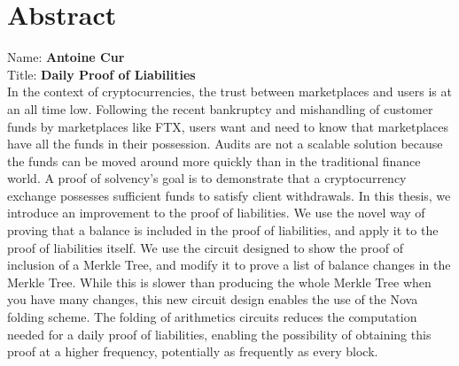 
\chapter*{Abstract}

Name: 	\tab \textbf{Antoine Cur} \\
Title: 	\tab \textbf{Daily Proof of Liabilities}\\

In the context of cryptocurrencies, the trust between marketplaces and users is at an all time low. 
Following the recent bankruptcy and mishandling of customer funds by marketplaces like FTX, 
users want and need to know that marketplaces have all the funds in their possession. 
Audits are not a scalable solution because the funds can be moved around more quickly than in the traditional finance world. 
A proof of solvency's goal is to demonstrate that a cryptocurrency exchange possesses sufficient funds to satisfy client withdrawals. 
In this thesis, we introduce an improvement to the proof of liabilities. 
We use the novel way of proving that a balance is included in the proof of liabilities, 
and apply it to the proof of liabilities itself.
We use the circuit designed to show the proof of inclusion of a Merkle Tree, 
and modify it to prove a list of balance changes in the Merkle Tree. While this is slower than producing the whole 
Merkle Tree when you have many changes, this new circuit design enables the use of the Nova folding scheme. 
The folding of arithmetics circuits reduces the computation needed for a daily proof of liabilities, 
enabling the possibility of obtaining this proof at a higher frequency, potentially as frequently as every block.


